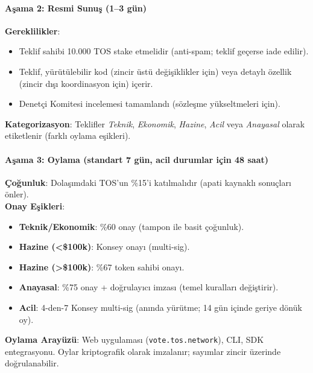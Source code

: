 \documentclass[11pt]{article}
\begin{document}
\begin{itemize}[noitemsep]
\begin{itemize}[noitemsep]
\begin{itemize}[noitemsep]
\begin{itemize}[noitemsep]
\begin{itemize}[noitemsep]
\begin{itemize}[noitemsep]
\begin{itemize}[noitemsep]
\begin{enumerate}[noitemsep]
\begin{itemize}[noitemsep]
\paragraph{Aşama 2: Resmi Sunuş (1--3 gün)}
\textbf{Gereklilikler}:
\begin{itemize}[noitemsep]
  \item Teklif sahibi 10.000 TOS stake etmelidir (anti-spam; teklif geçerse iade edilir).
  \item Teklif, yürütülebilir kod (zincir üstü değişiklikler için) veya detaylı özellik (zincir dışı koordinasyon için) içerir.
  \item Denetçi Komitesi incelemesi tamamlandı (sözleşme yükseltmeleri için).
\end{itemize}
\textbf{Kategorizasyon}: Teklifler \emph{Teknik}, \emph{Ekonomik}, \emph{Hazine}, \emph{Acil} veya \emph{Anayasal} olarak etiketlenir (farklı oylama eşikleri).

\paragraph{Aşama 3: Oylama (standart 7 gün, acil durumlar için 48 saat)}
\textbf{Çoğunluk}: Dolaşımdaki TOS'un \%15'i katılmalıdır (apati kaynaklı sonuçları önler).\\
\textbf{Onay Eşikleri}:
\begin{itemize}[noitemsep]
  \item \textbf{Teknik/Ekonomik}: \%60 onay (tampon ile basit çoğunluk).
  \item \textbf{Hazine (<\$100k)}: Konsey onayı (multi-sig).
  \item \textbf{Hazine (>\$100k)}: \%67 token sahibi onayı.
  \item \textbf{Anayasal}: \%75 onay + doğrulayıcı imzası (temel kuralları değiştirir).
  \item \textbf{Acil}: 4-den-7 Konsey multi-sig (anında yürütme; 14 gün içinde geriye dönük oy).
\end{itemize}
\textbf{Oylama Arayüzü}: Web uygulaması (\texttt{vote.tos.network}), CLI, SDK entegrasyonu. Oylar kriptografik olarak imzalanır; sayımlar zincir üzerinde doğrulanabilir.


\end{itemize}
\end{enumerate}
\end{itemize}
\end{itemize}
\end{itemize}
\end{itemize}
\end{itemize}
\end{itemize}
\end{itemize}
\end{document}
